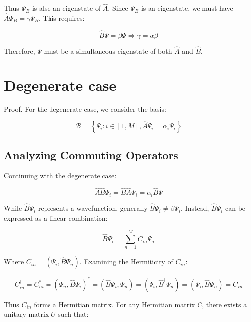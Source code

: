 \documentclass[italian]{HKNdocument}
\begin{document}
Thus $\Psi_{B}$ is also an eigenstate of $\hat{A}$. Since $\Psi_B$ is an eigenstate, we must have $\hat{A} \Psi_{B}=\gamma \Psi_{B}$. This requires:

\begin{equation}
\hat{B} \Psi=\beta \Psi \Longrightarrow \gamma=\alpha \beta \label{eq:7.24}
\end{equation}

Therefore, $\Psi$ must be a simultaneous eigenstate of both $\hat{A}$ and $\hat{B}$.

\section{Degenerate case}
Proof. For the degenerate case, we consider the basis:

\begin{equation}
\mathcal{B}=\left\{\Psi_{i}: i \in[1, M], \hat{A} \Psi_{i}=\alpha_{i} \Psi_{i}\right\} \label{eq:7.25}
\end{equation}


\subsection{Analyzing Commuting Operators}
Continuing with the degenerate case:

\begin{equation}
\hat{A} \hat{B} \Psi_{i}=\hat{B} \hat{A} \Psi_{i}=\alpha_{i} \hat{B} \Psi \label{eq:7.26}
\end{equation}

While $\hat{B} \Psi_{i}$ represents a wavefunction, generally $\hat{B} \Psi_{i} \neq \beta \Psi_{i}$. Instead, $\hat{B} \Psi_{i}$ can be expressed as a linear combination:

\begin{equation}
\hat{B} \Psi_{i}=\sum_{n=1}^{M} C_{i n} \Psi_{n} \label{eq:7.27}
\end{equation}

Where $C_{i n}=\left(\Psi_{i}, \hat{B} \Psi_{n}\right)$. Examining the Hermiticity of $C_{in}$:

\begin{equation}
C_{i n}^{\dagger}=C_{n i}^{*}=\left(\Psi_{n}, \hat{B} \Psi_{i}\right)^{*}=\left(\hat{B} \Psi_{i}, \Psi_{n}\right)=\left(\Psi_{i}, \hat{B}^{\dagger} \Psi_{n}\right)=\left(\Psi_{i}, \hat{B} \Psi_{n}\right)=C_{i n} \label{eq:7.28}
\end{equation}

Thus $C_{i n}$ forms a Hermitian matrix. For any Hermitian matrix $C$, there exists a unitary matrix $U$ such that:
\end{document}
